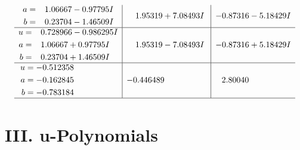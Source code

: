 \documentclass[1p]{elsarticle_modified}
\theoremstyle{definition}
\begin{document}
$$\begin{array}{c|c|c}
\begin{aligned}
a &= \phantom{-}1.06667 - 0.97795 I \\
b &= \phantom{-}0.23704 - 1.46509 I\end{aligned}
 & \phantom{-}1.95319 + 7.08493 I & -0.87316 - 5.18429 I \\ \hline\begin{aligned}
u &= \phantom{-}0.728966 - 0.986295 I \\
a &= \phantom{-}1.06667 + 0.97795 I \\
b &= \phantom{-}0.23704 + 1.46509 I\end{aligned}
 & \phantom{-}1.95319 - 7.08493 I & -0.87316 + 5.18429 I \\ \hline\begin{aligned}
u &= -0.512358\phantom{ +0.000000I} \\
a &= -0.162845\phantom{ +0.000000I} \\
b &= -0.783184\phantom{ +0.000000I}\end{aligned}
 & -0.446489\phantom{ +0.000000I} & \phantom{-}2.80040\phantom{ +0.000000I}\\
 \hline 
 \end{array}$$\newpage
\newpage\renewcommand{\arraystretch}{1}
\centering \section*{ III. u-Polynomials}
\end{document}
